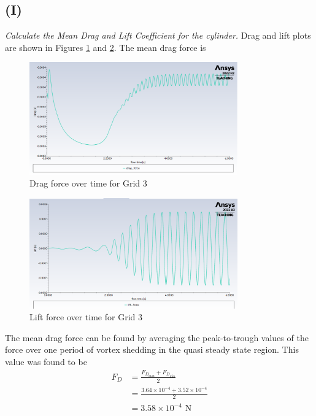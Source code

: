 \subsection{(I)}
\textit{Calculate the Mean Drag and Lift Coefficient for the cylinder.}
Drag and lift plots are shown in Figures \ref{fig:drag force plot grid 3} and \ref{fig:lift force plot grid 3}. The mean drag force is
\begin{figure}[H]
    \centering
    \includegraphics[width=0.8\textwidth]{Questions/Figures/drag force plot grid 3.png}
    \caption{Drag force over time for Grid 3}
    \label{fig:drag force plot grid 3}
\end{figure}
\begin{figure}[H]
    \centering
    \includegraphics[width=0.8\textwidth]{Questions/Figures/lift force plot grid 3.png}
    \caption{Lift force over time for Grid 3}
    \label{fig:lift force plot grid 3}
\end{figure}
The mean drag force can be found by averaging the peak-to-trough values of the force over one period of vortex shedding in the quasi steady state region. This value was found to be
\begin{align*}
    F_D &= \frac{F_{D_{\text{max}}} + F_{D_{\text{min}}}}{2} \\
    &= \frac{3.64 \times 10^{-4} + 3.52 \times 10^{-4}}{2} \\
    &= \boxed{3.58 \times 10^{-4} \text{ N}}
\end{align*}
